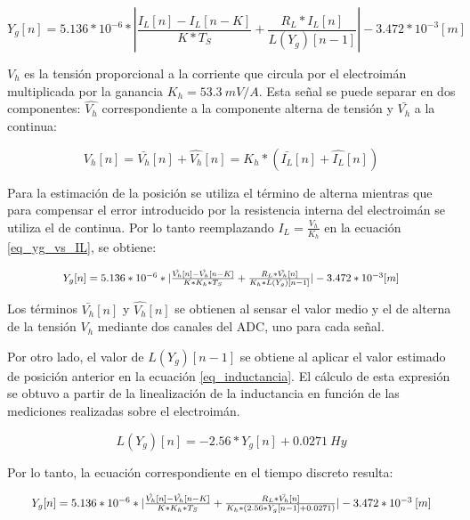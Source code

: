 \begin{equation} \label{eq_yg_vs_IL}
	Y_g[n] = 5.136*10^{-6}* |\frac{I_L[n]-I_L[n-K]}{K*T_S}+\frac{R_L*I_L[n]}{L(Y_g)[n-1]}| - 3.472*10^{-3} [m]
\end{equation}

$V_h$ es la tensión proporcional a la corriente que circula por el electroimán multiplicada por la ganancia $K_h=53.3\:mV/A$. Esta señal se puede separar en dos componentes: $\hat{V_h}$  correspondiente a la componente alterna de tensión y $\bar{V_h}$ a la continua:


\begin{equation} 
	V_h[n] = \bar{V_h}[n] + \hat{V_h}[n] = K_h * (\bar{I_L}[n] + \hat{I_L}[n])
\end{equation}

 Para la estimación de la posición se utiliza el término de alterna mientras que para compensar el error introducido por la resistencia interna del electroimán se utiliza el de continua. Por lo tanto reemplazando $I_L=\frac{V_h}{K_h}$ en la ecuación \ref{eq_yg_vs_IL}, se obtiene:

\begin{equation}
	\resizebox{.8\hsize}{!}
	{
	$Y_g[n] = 5.136*10^{-6}*|\frac{\hat{V_h}[n]-\hat{V_h}[n-K]}{K*K_h*T_S} + \frac{R_L*\bar{V_h}[n]}{K_h*L(Y_g)[n-1]}|-3.472*10^{-3}[m]$
	}
\end{equation}

Los términos $\bar{V_h}[n]$ y $\hat{V_h}[n]$ se obtienen al sensar el valor medio y el de alterna de la tensión $V_h$ mediante dos canales del ADC, uno para cada señal.

Por otro lado, el valor de $L(Y_g)[n-1]$ se obtiene al aplicar el valor estimado de posición anterior en la ecuación \ref{eq_inductancia}. El cálculo de esta expresión se obtuvo a partir de la linealización de la inductancia en función de las mediciones realizadas sobre el electroimán.


\begin{equation} \label{eq_inductancia}
	L(Y_g)[n] = -2.56*Y_g[n]+0.0271\:Hy
\end{equation}

 Por lo tanto, la ecuación correspondiente en el tiempo discreto resulta:

\begin{equation*}
	\resizebox{.95\hsize}{!}
	{
	$Y_g[n] = 5.136*10^{-6}*|\frac{\hat{V_h}[n]-\hat{V_h}[n-K]}{K*K_h*T_S} + \frac{R_L*\bar{V_h}[n]}{K_h*(2.56*Y_g[n-1]+0.0271)}|-3.472*10^{-3}\:[m]$
	}
\end{equation*}

